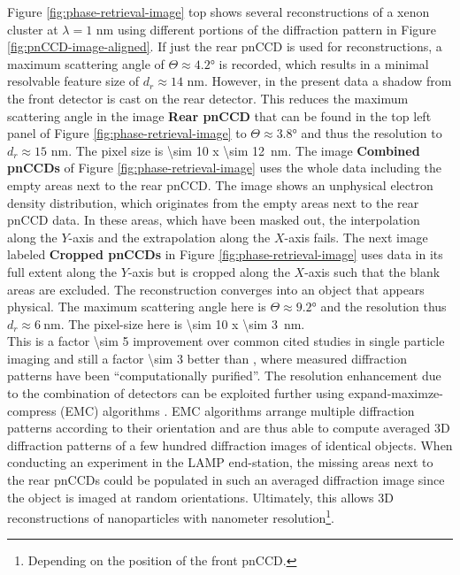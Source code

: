 Figure \ref{fig:phase-retrieval-image} top shows several reconstructions of a xenon cluster at $\lambda = 1$ nm using different portions of the diffraction pattern in Figure \ref{fig:pnCCD-image-aligned}. If just the rear pnCCD is used for reconstructions, a maximum scattering angle of $\Theta\approx 4.2$° is recorded, which results in a minimal resolvable feature size of $d_{r}\approx 14$ nm. However, in the present data a shadow from the front detector is cast on the rear detector. This reduces the maximum scattering angle in the image \textbf{Rear pnCCD} that can be found in the top left panel of Figure \ref{fig:phase-retrieval-image} to $\Theta\approx 3.8$° and thus the resolution to $d_{r}\approx 15$ nm. The pixel size is \SI{\sim 10 x \sim 12}{\nano\meter}. The image \textbf{Combined pnCCDs} of Figure \ref{fig:phase-retrieval-image} uses the whole data including the empty areas next to the rear pnCCD. The image shows an unphysical electron density distribution, which originates from the empty areas next to the rear pnCCD data. In these areas, which have been masked out, the interpolation along the $Y$-axis and the extrapolation along the $X$-axis fails. The next image labeled \textbf{Cropped pnCCDs} in Figure \ref{fig:phase-retrieval-image} uses data in its full extent along the $Y$-axis but is cropped along the $X$-axis such that the blank areas are excluded. The reconstruction converges into an object that appears physical. The maximum scattering angle here is $\Theta \approx 9.2$° and the resolution thus $d_{r}\approx \SI{6}{\nano\meter}$. The pixel-size here is \SI{\sim 10 x \sim 3}{\nano\meter}.\\[1\baselineskip]
%
This is a factor \num{\sim 5} improvement over common cited studies in single particle imaging \citep{Seibert-2011-Nature} and still a factor \num{\sim 3} better than \citep{Hantke-2014-NatPho}, where measured diffraction patterns have been ``computationally purified''. The resolution enhancement due to the combination of detectors can be exploited further using expand-maximze-compress (EMC) algorithms \citep{Loh-2009-PRE}. EMC algorithms arrange multiple diffraction patterns according to their orientation and are thus able to compute averaged 3D diffraction patterns of a few hundred diffraction images of identical objects. When conducting an experiment in the LAMP end-station, the missing areas next to the rear pnCCDs could be populated in such an averaged diffraction image since the object is imaged at random orientations. Ultimately, this allows 3D reconstructions of nanoparticles with nanometer resolution\footnote{Depending on the position of the front pnCCD.}.\\
%
%
%
